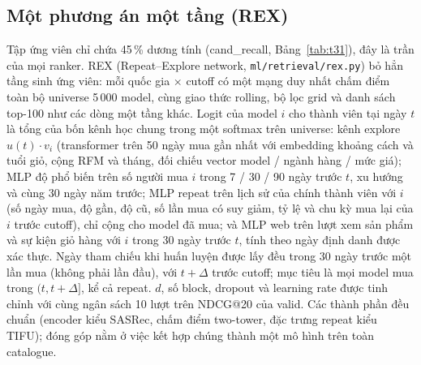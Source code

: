 \documentclass[jtehm]{ieeeaccess}
\begin{document}
\subsection{Một phương án một tầng (REX)}
\label{sec:rex}
Tập ứng viên chỉ chứa 45\,\% dương tính (cand\_recall, Bảng~\ref{tab:t31}), đây là trần của mọi ranker. REX (Repeat--Explore
network, \texttt{ml/retrieval/rex.py}) bỏ hẳn tầng sinh ứng viên: mỗi quốc gia $\times$ cutoff có một mạng duy nhất chấm điểm toàn
bộ universe 5\,000 model, cùng giao thức rolling, bộ lọc grid và danh sách top-100 như các dòng một tầng khác. Logit của model $i$
cho thành viên tại ngày $t$ là tổng của bốn kênh học chung trong một softmax trên universe: kênh explore $u(t)\cdot v_i$ (transformer
trên 50 ngày mua gần nhất với embedding khoảng cách và tuổi giỏ, cộng RFM và tháng, đối chiếu vector model / ngành hàng / mức giá);
MLP độ phổ biến trên số người mua $i$ trong 7 / 30 / 90 ngày trước $t$, xu hướng và cùng 30 ngày năm trước; MLP repeat trên lịch sử
của chính thành viên với $i$ (số ngày mua, độ gần, độ cũ, số lần mua có suy giảm, tỷ lệ và chu kỳ mua lại của $i$ trước cutoff), chỉ
cộng cho model đã mua; và MLP web trên lượt xem sản phẩm và sự kiện giỏ hàng với $i$ trong 30 ngày trước $t$, tính theo ngày định
danh được xác thực. Ngày tham chiếu khi huấn luyện được lấy đều trong 30 ngày trước một lần mua (không phải lần đầu), với
$t + \Delta$ trước cutoff; mục tiêu là mọi model mua trong $(t, t + \Delta]$, kể cả repeat. $d$, số block, dropout và learning rate
được tinh chỉnh với cùng ngân sách 10 lượt trên NDCG@20 của valid. Các thành phần đều chuẩn (encoder kiểu SASRec, chấm điểm
two-tower, đặc trưng repeat kiểu TIFU); đóng góp nằm ở việc kết hợp chúng thành một mô hình trên toàn catalogue.
\end{document}
